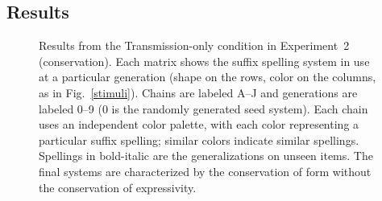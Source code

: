 \documentclass[doc,biblatex]{apa7}
\begin{document}
\subsection{Results}

	\begin{figure}
	\vspace*{2pt}
	\caption{Results from the Transmission-only condition in Experiment~2 (conservation). Each matrix shows the suffix spelling system in use at a particular generation (shape on the rows, color on the columns, as in Fig.~\ref{stimuli}). Chains are labeled A--J and generations are labeled 0–9 (0 is the randomly generated seed system). Each chain uses an independent color palette, with each color representing a particular suffix spelling; similar colors indicate similar spellings. Spellings in bold-italic are the generalizations on unseen items. The final systems are characterized by the conservation of form without the conservation of expressivity.}
	\label{con_lrn}
	\end{figure}
\end{document}
